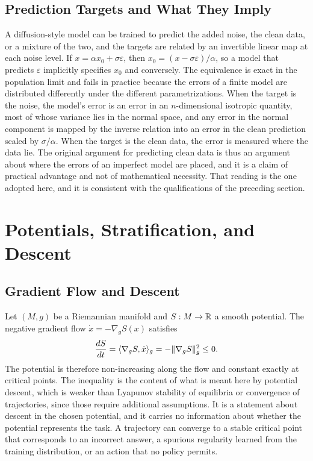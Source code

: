 \section{Prediction Targets and What They Imply}

A diffusion-style model can be trained to predict the added noise, the clean data, or a mixture of the two, and the targets are related by an invertible linear map at each noise level. If $x=\alpha x_0+\sigma\varepsilon$, then $x_0=(x-\sigma\varepsilon)/\alpha$, so a model that predicts $\varepsilon$ implicitly specifies $x_0$ and conversely. The equivalence is exact in the population limit and fails in practice because the errors of a finite model are distributed differently under the different parametrizations. When the target is the noise, the model's error is an error in an $n$-dimensional isotropic quantity, most of whose variance lies in the normal space, and any error in the normal component is mapped by the inverse relation into an error in the clean prediction scaled by $\sigma/\alpha$. When the target is the clean data, the error is measured where the data lie. The original argument for predicting clean data is thus an argument about where the errors of an imperfect model are placed, and it is a claim of practical advantage and not of mathematical necessity. That reading is the one adopted here, and it is consistent with the qualifications of the preceding section.

\chapter{Potentials, Stratification, and Descent}
\label{ch:dynamics}

\section{Gradient Flow and Descent}

Let $(M,g)$ be a Riemannian manifold and $S:M\to\mathbb{R}$ a smooth potential. The negative gradient flow $\dot x=-\nabla_gS(x)$ satisfies
\[
\frac{dS}{dt}=\langle \nabla_gS,\dot x\rangle_g=-\lVert \nabla_gS\rVert_g^2\le0.
\]
The potential is therefore non-increasing along the flow and constant exactly at critical points. The inequality is the content of what is meant here by potential descent, which is weaker than Lyapunov stability of equilibria or convergence of trajectories, since those require additional assumptions. It is a statement about descent in the chosen potential, and it carries no information about whether the potential represents the task. A trajectory can converge to a stable critical point that corresponds to an incorrect answer, a spurious regularity learned from the training distribution, or an action that no policy permits.

